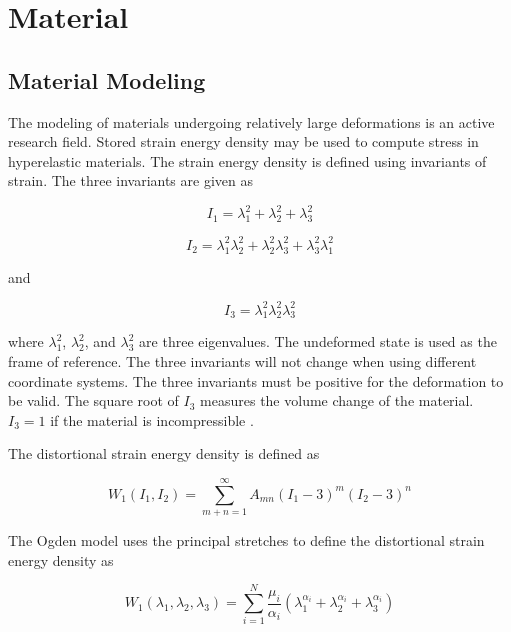 \section{Material}

\subsection{Material Modeling}

The modeling of materials undergoing relatively large deformations is an active research field. Stored strain energy density may be used to compute stress in hyperelastic materials. The strain energy density is defined using invariants of strain. The three invariants are given as

\begin{equation}
	I_{1}=\lambda_{1}^{2}+\lambda_{2}^{2}+\lambda_{3}^{2}
\end{equation}

\begin{equation}
	I_{2}=\lambda_{1}^{2}\lambda_{2}^{2}+\lambda_{2}^{2}\lambda_{3}^{2}+\lambda_{3}^{2}\lambda_{1}^{2}
\end{equation}

and

\begin{equation}
	I_{3}=\lambda_{1}^{2}\lambda_{2}^{2}\lambda_{3}^{2}
\end{equation}

where $\lambda_{1}^{2}$, $\lambda_{2}^{2}$, and $\lambda_{3}^{2}$ are three eigenvalues. The undeformed state is used as the frame of reference. The three invariants will not change when using different coordinate systems. The three invariants must be positive for the deformation to be valid. The square root of $I_{3}$ measures the volume change of the material. $I_{3}=1$ if the material is incompressible \cite{Kim2015}.

The distortional strain energy density is defined as

\begin{equation}
	W_{1}\left ( I_{1},I_{2} \right )=\sum_{m+n=1}^{\infty}A_{mn}\left ( I_{1}-3 \right )^{m}\left ( I_{2}-3 \right )^{n}
\end{equation}

The Ogden model uses the principal stretches to define the distortional strain energy density as

\begin{equation}
	\label{eq:om}
	W_{1}\left ( \lambda_{1},  \lambda_{2}, \lambda_{3} \right )=\sum_{i=1}^{N}\frac{\mu_{i}}{\alpha_{i}}\left ( \lambda_{1}^{\alpha_{i}} + \lambda_{2}^{\alpha_{i}} + \lambda_{3}^{\alpha_{i}} \right )
\end{equation}

